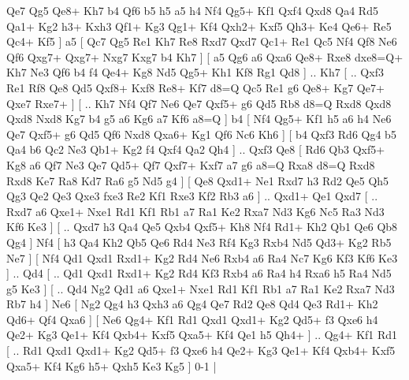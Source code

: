 Qe7 Qg5  Qe8+ Kh7  b4 Qf6  b5 h5  a5 h4  Nf4 Qg5+  Kf1 Qxf4  Qxd8 Qa4  Rd5 Qa1+  Kg2 h3+  Kxh3 Qf1+  Kg3 Qg1+  Kf4 Qxh2+  Kxf5 Qh3+  Ke4 Qe6+  Re5 Qc4+  Kf5   ]  a5 [  Qc7 Qg5  Re1 Kh7  Re8 Rxd7  Qxd7 Qc1+  Re1 Qc5  Nf4 Qf8  Ne6 Qf6  Qxg7+ Qxg7+  Nxg7 Kxg7  b4 Kh7   ]  [  a5 Qg6  a6 Qxa6  Qe8+ Rxe8  dxe8=Q+ Kh7  Ne3 Qf6  b4 f4  Qe4+ Kg8  Nd5 Qg5+  Kh1 Kf8  Rg1 Qd8   ] .. Kh7 [ .. Qxf3  Re1 Rf8  Qe8 Qd5  Qxf8+ Kxf8  Re8+ Kf7  d8=Q Qc5  Re1 g6  Qe8+ Kg7  Qe7+ Qxe7  Rxe7+   ]  [ .. Kh7  Nf4 Qf7  Ne6 Qe7  Qxf5+ g6  Qd5 Rb8  d8=Q Rxd8  Qxd8 Qxd8  Nxd8 Kg7  b4 g5  a6 Kg6  a7 Kf6  a8=Q   ]  b4 [  Nf4 Qg5+  Kf1 h5  a6 h4  Ne6 Qe7  Qxf5+ g6  Qd5 Qf6  Nxd8 Qxa6+  Kg1 Qf6  Nc6 Kh6   ]  [  b4 Qxf3  Rd6 Qg4  b5 Qa4  b6 Qc2  Ne3 Qb1+  Kg2 f4  Qxf4 Qa2  Qh4   ] .. Qxf3    Qe8 [  Rd6 Qb3  Qxf5+ Kg8  a6 Qf7  Ne3 Qe7  Qd5+ Qf7  Qxf7+ Kxf7  a7 g6  a8=Q Rxa8  d8=Q Rxd8  Rxd8 Ke7  Ra8 Kd7  Ra6 g5  Nd5 g4   ]  [  Qe8 Qxd1+  Ne1 Rxd7  h3 Rd2  Qe5 Qh5  Qg3 Qe2  Qe3 Qxe3  fxe3 Re2  Kf1 Rxe3  Kf2 Rb3  a6   ] .. Qxd1+    Qe1   Qxd7 [ .. Rxd7  a6 Qxe1+  Nxe1 Rd1  Kf1 Rb1  a7 Ra1  Ke2 Rxa7  Nd3 Kg6  Nc5 Ra3  Nd3 Kf6  Ke3   ]  [ .. Qxd7  h3 Qa4  Qe5 Qxb4  Qxf5+ Kh8  Nf4 Rd1+  Kh2 Qb1  Qe6 Qb8  Qg4   ]  Nf4 [  h3 Qa4  Kh2 Qb5  Qe6 Rd4  Ne3 Rf4  Kg3 Rxb4  Nd5 Qd3+  Kg2 Rb5  Ne7   ]  [  Nf4 Qd1  Qxd1 Rxd1+  Kg2 Rd4  Ne6 Rxb4  a6 Ra4  Nc7 Kg6  Kf3 Kf6  Ke3   ] .. Qd4 [ .. Qd1  Qxd1 Rxd1+  Kg2 Rd4  Kf3 Rxb4  a6 Ra4  h4 Rxa6  h5 Ra4  Nd5 g5  Ke3   ]  [ .. Qd4  Ng2 Qd1  a6 Qxe1+  Nxe1 Rd1  Kf1 Rb1  a7 Ra1  Ke2 Rxa7  Nd3 Rb7  h4   ]  Ne6 [  Ng2 Qg4  h3 Qxh3  a6 Qg4  Qe7 Rd2  Qe8 Qd4  Qe3 Rd1+  Kh2 Qd6+  Qf4 Qxa6   ]  [  Ne6 Qg4+  Kf1 Rd1  Qxd1 Qxd1+  Kg2 Qd5+  f3 Qxe6  h4 Qe2+  Kg3 Qe1+  Kf4 Qxb4+  Kxf5 Qxa5+  Kf4 Qe1  h5 Qh4+   ] .. Qg4+    Kf1   Rd1    [ .. Rd1  Qxd1 Qxd1+  Kg2 Qd5+  f3 Qxe6  h4 Qe2+  Kg3 Qe1+  Kf4 Qxb4+  Kxf5 Qxa5+  Kf4 Kg6  h5+ Qxh5  Ke3 Kg5   ] 0-1  |
